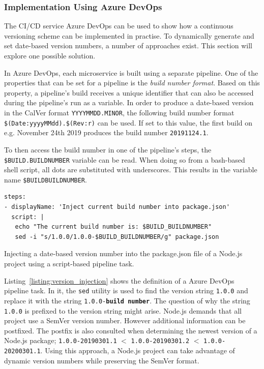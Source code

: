 \subsubsection{Implementation Using Azure DevOps}%
\label{ssub:Implementation_Using_Azure_DevOps}
The \ac{CI}/\ac{CD} service Azure DevOps can be used to show how a continuous
versioning scheme can be implemented in practise. To dynamically generate and
set date-based version numbers, a number of approaches exist. This section will
explore one possible solution.

In Azure DevOps, each microservice is built using a separate pipeline. One of
the properties that can be set for a pipeline is the \textit{build number
format}. Based on this property, a pipeline's build receives a unique identifier
that can also be accessed during the pipeline's run as a variable. In order to
produce a date-based version in the CalVer format \texttt{YYYYMMDD.MINOR}, the
following build number format \texttt{\$(Date:yyyyMMdd).\$(Rev:r)} can be used.
If set to this value, the first build on e.g. November 24th 2019 produces the
build number \texttt{20191124.1}.

To then access the build number in one of the pipeline's steps, the
\texttt{\$BUILD.BUILDNUMBER} variable can be read. When doing so from a
bash-based shell script, all dots are substituted with underscores. This
results in the variable name \texttt{\$BUILD\textunderscore BUILDNUMBER}.

\begin{listing}[H]
  \begin{verbatim}
steps:
- displayName: 'Inject current build number into package.json'
  script: |
   echo "The current build number is: $BUILD_BUILDNUMBER"
   sed -i "s/1.0.0/1.0.0-$BUILD_BUILDNUMBER/g" package.json
  \end{verbatim}
  \caption{Injecting a date-based version number into the package.json file of
  a Node.js project using a script-based pipeline task.}%
  \label{listing:version_injection}
\end{listing}

Listing~\ref{listing:version_injection} shows the definition of a Azure DevOps
pipeline task. In it, the \texttt{sed} utility is used to find the version
string \texttt{1.0.0} and replace it with the string
\texttt{1.0.0-\textbf{build number}}. The question of why the string
\texttt{1.0.0} is prefixed to the version string might arise. Node.js demands
that all project use a SemVer version number. However additional information
can be postfixed. The postfix is also consulted when determining the newest
version of a Node.js package; \texttt{1.0.0-20190301.1} $<$
\texttt{1.0.0-20190301.2} $<$ \texttt{1.0.0-20200301.1}. Using this approach, a
Node.js project can take advantage of dynamic version numbers while preserving
the SemVer format.

